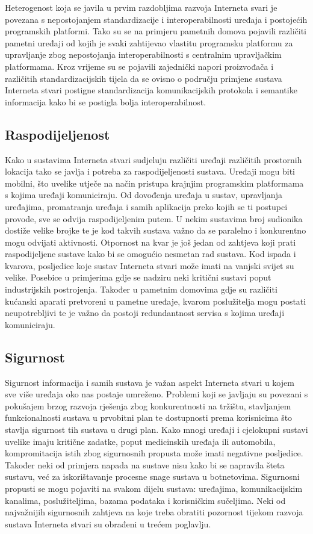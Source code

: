\documentclass[times, utf8, diplomski]{fer}
\begin{document}
Heterogenost koja se javila u prvim razdobljima razvoja Interneta svari je povezana s nepostojanjem standardizacije i interoperabilnosti uređaja i postojećih programskih platformi. Tako su se na primjeru pametnih domova pojavili različiti pametni uređaji od kojih je svaki zahtijevao vlastitu programsku platformu za upravljanje zbog nepostojanja interoperabilnosti s centralnim upravljačkim platformama. Kroz vrijeme su se pojavili zajednički napori proizvođača i različitih standardizacijskih tijela da se ovisno o području primjene sustava Interneta stvari postigne standardizacija komunikacijskih protokola i semantike informacija kako bi se postigla bolja interoperabilnost.

\subsection{Raspodijeljenost}
Kako u sustavima Interneta stvari sudjeluju različiti uređaji različitih prostornih lokacija tako se javlja i potreba za raspodijeljenosti sustava. Uređaji mogu biti mobilni, što uvelike utječe na način pristupa krajnjim programskim platformama s kojima uređaji komuniciraju. Od dovođenja uređaja u sustav, upravljanja uređajima, promatranja uređaja i samih aplikacija preko kojih se ti postupci provode, sve se odvija raspodijeljenim putem. U nekim sustavima broj sudionika dostiže velike brojke te je kod takvih sustava važno da se paralelno i konkurentno mogu odvijati aktivnosti. Otpornost na kvar je još jedan od zahtjeva koji prati raspodijeljene sustave kako bi se omogućio nesmetan rad sustava. Kod ispada i kvarova, posljedice koje sustav Interneta stvari može imati na vanjski svijet su velike. Posebice u primjerima gdje se nadziru neki kritični sustavi poput industrijskih postrojenja. Također u pametnim domovima gdje su različiti kućanski aparati pretvoreni u pametne uređaje, kvarom poslužitelja mogu postati neupotrebljivi te je važno da postoji redundantnost servisa s kojima uređaji komuniciraju.

\subsection{Sigurnost}
Sigurnost informacija i samih sustava je važan aspekt Interneta stvari u kojem sve više uređaja oko nas postaje umreženo. Problemi koji se javljaju su povezani s pokušajem brzog razvoja rješenja zbog konkurentnosti na tržištu, stavljanjem funkcionalnosti sustava u prvobitni plan te dostupnosti prema korisnicima što stavlja sigurnost tih sustava u drugi plan. Kako mnogi uređaji i cjelokupni sustavi uvelike imaju kritične zadatke, poput medicinskih uređaja ili automobila, kompromitacija istih zbog sigurnosnih propusta može imati negativne posljedice. Također neki od primjera napada na sustave nisu kako bi se napravila šteta sustavu, već za iskorištavanje procesne snage sustava u botnetovima. Sigurnosni propusti se mogu pojaviti na svakom dijelu sustava: uređajima, komunikacijskim kanalima, poslužiteljima, bazama podataka i korisničkim sučeljima. Neki od najvažnijih sigurnosnih zahtjeva na koje treba obratiti pozornost tijekom razvoja sustava Interneta stvari su obrađeni u trećem poglavlju.
\end{document}
